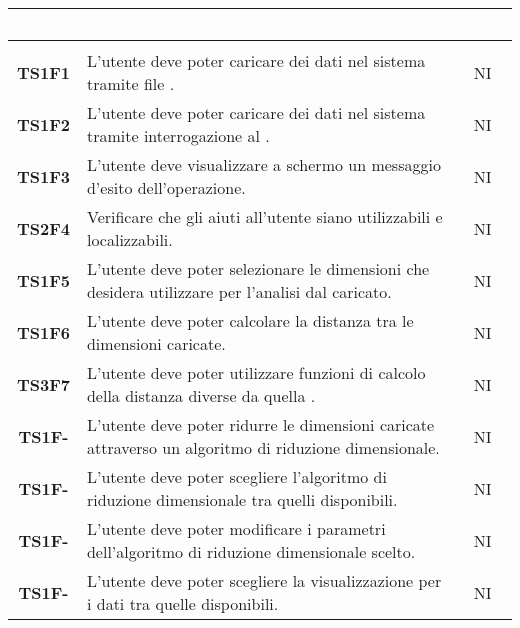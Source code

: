 \begin{longtable}{ c|C{12cm}|c } 
		\textcolor{white}{\textbf{Codice}} & 
		\textcolor{white}{\textbf{Descrizione}} & 
		\textcolor{white}{\textbf{Stato}} \\
		\endfirsthead
		\\
	    \endfoot
	    \endlastfoot

\textbf{TS1F1} & 
L'utente deve poter caricare dei dati nel sistema tramite file . & 
NI\\

\textbf{TS1F2} & 
L'utente deve poter caricare dei dati nel sistema tramite interrogazione al . & 
NI\\

\textbf{TS1F3} & 
L'utente deve visualizzare a schermo un messaggio d'esito dell'operazione. & 
NI\\
		
\textbf{TS2F4} & 
Verificare che gli aiuti all'utente siano utilizzabili e localizzabili. & 
NI\\		

\textbf{TS1F5} & 
L'utente deve poter selezionare le dimensioni che desidera utilizzare per l'analisi dal  caricato. & 
NI\\	

\textbf{TS1F6} & 
L'utente deve poter calcolare la distanza tra le dimensioni caricate. & 
NI\\	

\textbf{TS3F7} & 
L'utente deve poter utilizzare funzioni di calcolo della distanza diverse da quella . & 
NI\\	

\textbf{TS1F-} & 
L'utente deve poter ridurre le dimensioni caricate attraverso un algoritmo di riduzione dimensionale. & 
NI\\

\textbf{TS1F-} & 
L'utente deve poter scegliere l'algoritmo di riduzione dimensionale tra quelli disponibili. & 
NI\\

\textbf{TS1F-} & 
L'utente deve poter modificare i parametri dell'algoritmo di riduzione dimensionale scelto. & 
NI\\

\textbf{TS1F-} & 
L'utente deve poter scegliere la visualizzazione per i dati tra quelle disponibili. & 
NI\\


\end{longtable}

